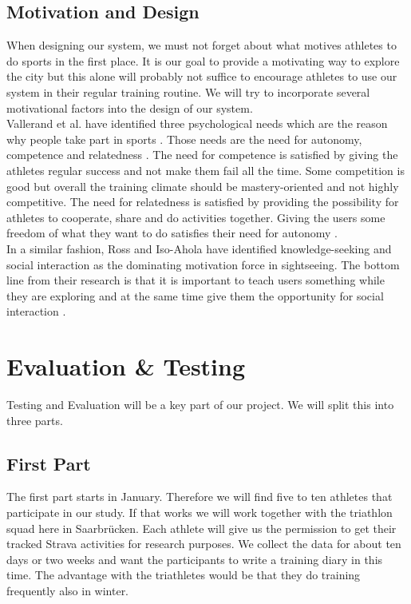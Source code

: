 \documentclass{sigchi}
\begin{document}
\subsection{Motivation and Design}
When designing our system, we must not forget about what motives athletes to do sports in the first place. It is our goal to provide a motivating way to explore the city but this alone will probably not suffice to encourage athletes to use our system in their regular training routine. We will try to incorporate several motivational factors into the design of our system.\\
Vallerand et al. have identified three psychological needs which are the reason why people take part in sports \cite{vallerand2007intrinsic}. Those needs are the need for autonomy, competence and relatedness \cite{vallerand1999integrative}. The need for competence is satisfied by giving the athletes regular success and not make them fail all the time. Some competition is good but overall the training climate should be mastery-oriented and not highly competitive. The need for relatedness is satisfied by providing the possibility for athletes to cooperate, share and do activities together. Giving the users some freedom of what they want to do satisfies their need for autonomy \cite{vallerand2007intrinsic}.\\
In a similar fashion, Ross and Iso-Ahola have identified knowledge-seeking and social interaction as the dominating motivation force in sightseeing. The bottom line from their research is that it is important to teach users something while they are exploring and at the same time give them the opportunity for social interaction \cite{DUNNROSS1991226}.

\section{Evaluation \& Testing}
Testing and Evaluation will be a key part of our project. We will split this into three parts. 
\subsection{First Part}
The first part starts in January. Therefore we will find five to ten athletes that participate in our study. If that works we will work together with the triathlon squad here in Saarbr\"ucken. Each athlete will give us the permission to get their tracked Strava activities for research purposes. We collect the data for about ten days or two weeks and want the participants to write a training diary in this time. The advantage with the triathletes would be that they do training frequently also in winter. 
\end{document}
